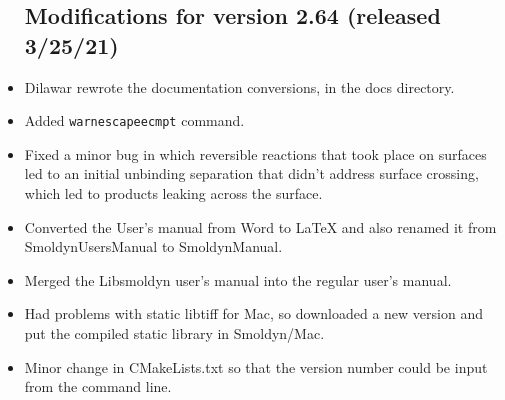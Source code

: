 \documentclass {scrbook}
\newcommand {\ttt} {\texttt}
\begin{document}
\begin{itemize}
\subsection{Modifications for version 2.64 (released 3/25/21)}
\item Dilawar rewrote the documentation conversions, in the docs directory.
\item Added \ttt{warnescapeecmpt} command.
\item Fixed a minor bug in which reversible reactions that took place on surfaces led to an initial unbinding separation that didn't address surface crossing, which led to products leaking across the surface.
\item Converted the User's manual from Word to LaTeX and also renamed it from SmoldynUsersManual to SmoldynManual.
\item Merged the Libsmoldyn user's manual into the regular user's manual.
\item Had problems with static libtiff for Mac, so downloaded a new version and put the compiled static library in Smoldyn/Mac.
\item Minor change in CMakeLists.txt so that the version number could be input from the command line.


\end{itemize}
\end{document}
